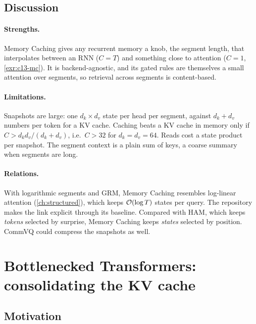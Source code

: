 \subsection{Discussion}

\paragraph{Strengths.} Memory Caching gives any recurrent memory a knob, the segment length, that
interpolates between an RNN ($C=T$) and something close to attention ($C=1$, \cref{exr:c13-mc}). It is
backend-agnostic, and its gated rules are themselves a small attention over segments, so retrieval
across segments is content-based.

\paragraph{Limitations.} Snapshots are large: one $d_k\times d_v$ state per head per segment, against
$d_k+d_v$ numbers per token for a KV cache. Caching beats a KV cache in memory only if $C>d_kd_v/(d_k+d_v)$,
i.e.\ $C>32$ for $d_k=d_v=64$. Reads cost a state product per snapshot. The segment context is a plain sum
of keys, a coarse summary when segments are long.

\paragraph{Relations.} With logarithmic segments and GRM, Memory Caching resembles log-linear
attention (\cref{ch:structured}), which keeps $\mathcal{O}(\log T)$ states per query. The repository makes the
link explicit through its  baseline. Compared with HAM, which keeps \emph{tokens}
selected by surprise, Memory Caching keeps \emph{states} selected by position. CommVQ could compress the
snapshots as well.

\section{Bottlenecked Transformers: consolidating the KV cache}\label{sec:c13-bottleneck}

\subsection{Motivation}

